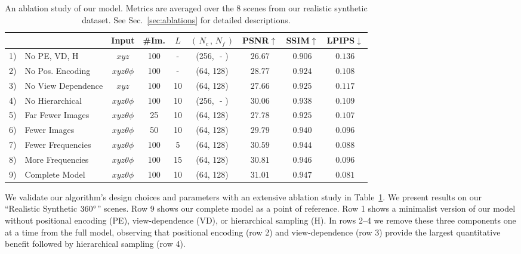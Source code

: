 \documentclass[runningheads]{llncs}
\newcommand{\mbf}[1]{{\mathbf{#1}}}
\newcommand{\numsamplescoarse}{N_c}
\newcommand{\numsamplesfine}{N_f}
\newcommand{\posxyz}{xyz}
\newcommand{\angletheta}{\theta}
\newcommand{\anglephi}{\phi}
\newcommand{\posall}{\posxyz\angletheta\anglephi}
\newcommand{\numfrequencies}{L}
\begin{document}
\setlength{\tabcolsep}{4pt}
\begin{table}[t]
\centering
\begin{tabular}{@{\,}l@{\,\,}l|cccc|ccc@{\,}}
& & Input & \#Im. & $\numfrequencies$ & $(\,\numsamplescoarse\,, \,\numsamplesfine\,)$ &  PSNR$\uparrow$ & SSIM$\uparrow$ & LPIPS$\downarrow$  \\
\hline
1) & No PE, VD, H & $\posxyz$ & 100 & -  & (256, \,\,-\,\,)    &  $26.67$ & $0.906$ & $0.136$  \\
2) & No Pos. Encoding & $\posall$  & 100 & -  &  (64, 128)     &  $28.77$ & $0.924$ & $0.108$  \\
3) & No View Dependence & $\posxyz$ & 100 & 10 &  (64, 128)    &  $27.66$ & $0.925$ & $0.117$  \\
4) & No Hierarchical & $\posall$ & 100 & 10 & (256, \,\,-\,\,) &  $30.06$ & $0.938$ & $0.109$  \\
\arrayrulecolor{gray}
\hline
\arrayrulecolor{black}
5) & Far Fewer Images & $\posall$  & 25  & 10 &  (64, 128)     &  $27.78$ & $0.925$ & $0.107$  \\
6) & Fewer Images  & $\posall$  & 50  & 10 &  (64, 128)        &  $29.79$ & $0.940$ & $0.096$  \\
\arrayrulecolor{gray}
\hline
\arrayrulecolor{black}
7) & Fewer Frequencies & $\posall$ & 100 & 5  &  (64, 128)     &  $30.59$ & $0.944$ & $0.088$  \\
8) & More Frequencies & $\posall$ & 100 & 15 &  (64, 128)      &  $30.81$ & $0.946$ & $0.096$  \\
\arrayrulecolor{gray}
\hline
\arrayrulecolor{black}
9) & Complete Model & $\posall$ & 100 & 10 & (64, 128)         &  $\mbf{31.01}$ & $\mbf{0.947}$ & $\mbf{0.081}$ 
\end{tabular}\vspace{2mm}
\caption{An ablation study of our model. Metrics are averaged over the 8 scenes from our realistic synthetic dataset. See Sec.~\ref{sec:ablations} for detailed descriptions.
}
\label{table:ablations}
\end{table}
\setlength{\tabcolsep}{1.4pt} 
We validate our algorithm's design choices and parameters with an extensive ablation study in Table~\ref{table:ablations}. We present results on our ``Realistic Synthetic $360\degree$'' scenes. Row 9 shows our complete model as a point of reference.
Row 1 shows a minimalist version of our model without positional encoding (PE), view-dependence (VD), or hierarchical sampling (H). In rows 2--4 we remove these three components one at a time from the full model, observing that positional encoding (row 2) and view-dependence (row 3) provide the largest quantitative benefit followed by hierarchical sampling (row 4).
\end{document}
